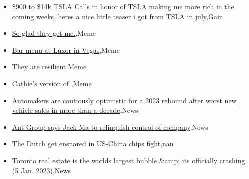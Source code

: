 \documentclass{article}%
\begin{document}
%
\begin{itemize}%
\item%
\href{https://reddit.com/r/wallstreetbets/comments/105ljgw/900\_to\_14k\_tsla\_calls\_in\_honor\_of\_tsla\_making\_me/}{\$900 to \$14k TSLA Calls in honor of TSLA making me more rich in the coming weeks, heres a nice little teaser i got from TSLA in july},Gain%
\item%
\href{https://reddit.com/r/wallstreetbets/comments/105k0sr/so\_glad\_they\_get\_me/}{So glad they get me.},Meme%
\item%
\href{https://reddit.com/r/wallstreetbets/comments/105jc4m/bar\_menu\_at\_luxor\_in\_vegas/}{Bar menu at Luxor in Vegas},Meme%
\item%
\href{https://reddit.com/r/wallstreetbets/comments/105ijg4/they\_are\_resilient/}{They are resilient},Meme%
\item%
\href{https://reddit.com/r/wallstreetbets/comments/105hfbj/cathies\_version\_of/}{Cathie's version of     },Meme%
\item%
\href{https://reddit.com/r/Economics/comments/105i9p4/automakers\_are\_cautiously\_optimistic\_for\_a\_2023/}{Automakers are cautiously optimistic for a 2023 rebound after worst new vehicle sales in more than a decade},News%
\item%
\href{https://reddit.com/r/Economics/comments/105elin/ant\_group\_says\_jack\_ma\_to\_relinquish\_control\_of/}{Ant Group says Jack Ma to relinquish control of company},News%
\item%
\href{https://reddit.com/r/Economics/comments/1054c1r/the\_dutch\_get\_ensnared\_in\_uschina\_chips\_fight/}{The Dutch get ensnared in US-China chips fight},nan%
\item%
\href{https://reddit.com/r/Economics/comments/1053sa0/toronto\_real\_estate\_is\_the\_worlds\_largest\_bubble/}{Toronto real estate is the worlds largest bubble \&amp; its officially crashing (5 Jan. 2023)},News%
\end{itemize}%
\end{document}
